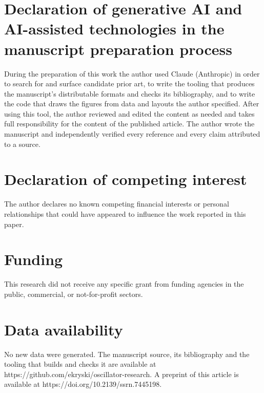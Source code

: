 \documentclass[a4paper,fleqn]{cas-sc}
\begin{document}
\section*{Declaration of generative AI and AI-assisted technologies in
the manuscript preparation
process}\label{declaration-of-generative-ai-and-ai-assisted-technologies-in-the-manuscript-preparation-process}

During the preparation of this work the author used Claude (Anthropic)
in order to search for and surface candidate prior art, to write the
tooling that produces the manuscript's distributable formats and checks
its bibliography, and to write the code that draws the figures from data
and layouts the author specified. After using this tool, the author
reviewed and edited the content as needed and takes full responsibility
for the content of the published article. The author wrote the
manuscript and independently verified every reference and every claim
attributed to a source.

\printcredits
\section*{Declaration of competing interest}
The author declares no known competing financial interests or personal
relationships that could have appeared to influence the work reported in
this paper.
\section*{Funding}
This research did not receive any specific grant from funding agencies
in the public, commercial, or not-for-profit sectors.
\section*{Data availability}
No new data were generated. The manuscript source, its bibliography and
the tooling that builds and checks it are available at
https://github.com/ekryski/oscillator-research. A preprint of this
article is available at https://doi.org/10.2139/ssrn.7445198.


\end{document}
